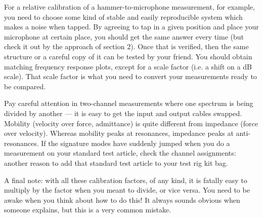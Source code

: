   For a relative calibration of a hammer-to-microphone measurement, for 
  example, you need to choose some kind of stable and easily reproducible 
  system which makes a noise when tapped. By agreeing to tap in a given 
  position and place your microphone at certain place, you should get the same 
  answer every time (but check it out by the approach of section 2). Once that 
  is verified, then the same structure or a careful copy of it can be tested by 
  your friend. You should obtain matching frequency response plots, except for 
  a scale factor (i.e. a shift on a dB scale). That scale factor is what you 
  need to convert your measurements ready to be compared. 

  Pay careful attention in two-channel measurements where one spectrum is being 
  divided by another — it is easy to get the input and output cables swapped. 
  Mobility (velocity over force, admittance) is quite different from impedance 
  (force over velocity). Whereas mobility peaks at resonances, impedance peaks 
  at anti-resonances. If the signature modes have suddenly jumped when you do a 
  measurement on your standard test article, check the channel assignments: 
  another reason to add that standard test article to your test rig kit bag. 

  A final note: with all these calibration factors, of any kind, it is fatally 
  easy to multiply by the factor when you meant to divide, or vice versa. You 
  need to be awake when you think about how to do this! It always sounds 
  obvious when someone explains, but this is a very common mistake. 